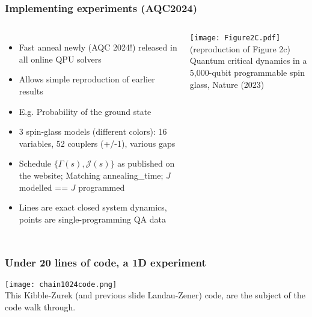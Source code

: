 \documentclass[aspectratio=169,final,11pt,forpublic]{beamer} %
\begin{document}
\begin{frame}\frametitle{\bf Implementing experiments (AQC2024)}
  \begin{columns}
    \vspace{-0.2cm}
    \begin{itemize}
      \item Fast anneal newly (AQC 2024!) released in all online QPU solvers
        
      \item Allows simple reproduction of earlier results

      \item E.g. Probability of the ground state
  
      \item 3 spin-glass models (different colors):
        16 variables, 52 couplers (+/-1), various gaps

      \item Schedule $\{\Gamma(s), \mathcal{J}(s)\}$ as published on the website; Matching annealing\_time; $J$ modelled == $J$ programmed
        
      \item Lines are exact closed system dynamics, points are single-programming QA data
  \end{itemize}
  \begin{center}
  \texttt{[image: Figure2C.pdf]}\\
  (reproduction of Figure 2c) \\
  {\small Quantum critical dynamics in
  a 5,000-qubit programmable spin glass, Nature
  (2023)}
  \end{center}
\end{columns}
\end{frame}

\begin{frame}\frametitle{\bf Under 20 lines of code, a 1D experiment}
  \begin{center}
    \texttt{[image: chain1024code.png]}\\
    This Kibble-Zurek (and previous slide Landau-Zener) code, are the subject of the code walk through.
  \end{center}
\end{frame}
\end{document}
